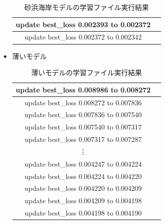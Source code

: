 \documentclass[dvipdfmx]{jsarticle}
\begin{document}
\begin{itemize}
\begin{table}[H]
\begin{tabular}{|c|c|}
            update best\_loss 0.002393 to 0.002372 \\
            \hline
            
            update best\_loss 0.002372 to 0.002342 \\
            \hline
        \end{tabular}
        \caption{砂浜海岸モデルの学習ファイル実行結果}
        \label{makemodel1}
    \end{table}
    
    
    \item 薄いモデル

    \begin{table}[H]
        \centering
        \begin{tabular}{|c|c|}
            \hline
            update best\_loss 0.008986 to 0.008272 \\
            \hline
            
            update best\_loss 0.008272 to 0.007836 \\
            \hline
            
            update best\_loss 0.007836 to 0.007540 \\
            \hline
            
            update best\_loss 0.007540 to 0.007317 \\
            \hline
            
            update best\_loss 0.007317 to 0.007287 \\
            \hline

            \vdots \\
            \hline
            
            update best\_loss 0.004247 to 0.004224 \\
            \hline
            
            update best\_loss 0.004224 to 0.004220 \\
            \hline
            
            update best\_loss 0.004220 to 0.004209 \\
            \hline
            
            update best\_loss 0.004209 to 0.004198 \\
            \hline
            
            update best\_loss 0.004198 to 0.004190 \\
            \hline
        \end{tabular}
        \caption{薄いモデルの学習ファイル実行結果}
        \label{makemodel2}
    \end{table}


\end{itemize}
\end{document}
